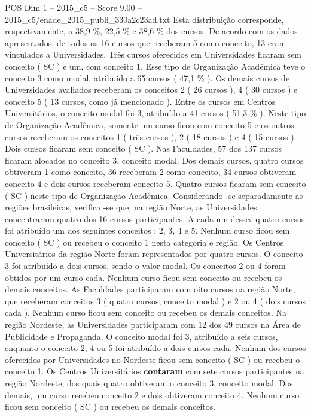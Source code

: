 \begin{textsample}{POS Dim 1 – 2015\_c5 – Score 9.00 – 2015\_c5/enade\_2015\_publi\_330a2c23ad.txt}
Esta distribuição corresponde, respectivamente, a 38,9 \%, 22,5 \% e 38,6 \% dos cursos.
De acordo com os dados apresentados, de todos os 16 cursos que receberam 5 como conceito, 13 eram vinculados a Universidades.
Três cursos oferecidos em Universidades ficaram sem conceito ( SC ) e um, com conceito 1.
Esse tipo de Organização Acadêmica teve o conceito 3 como modal, atribuído a 65 cursos ( 47,1 \% ).
Os demais cursos de Universidades avaliados receberam os conceitos 2 ( 26 cursos ), 4 ( 30 cursos ) e conceito 5 ( 13 cursos, como já mencionado ).
Entre os cursos em Centros Universitários, o conceito modal foi 3, atribuído a 41 cursos ( 51,3 \% ).
Neste tipo de Organização Acadêmica, somente um curso ficou com conceito 5 e os outros cursos receberam os conceitos 1 ( três cursos ), 2 ( 18 cursos ) e 4 ( 15 cursos ).
Dois cursos ficaram sem conceito ( SC ).
Nas Faculdades, 57 dos 137 cursos ficaram alocados no conceito 3, conceito modal.
Dos demais cursos, quatro cursos obtiveram 1 como conceito, 36 receberam 2 como conceito, 34 cursos obtiveram conceito 4 e dois cursos receberam conceito 5.
Quatro cursos ficaram sem conceito ( SC ) neste tipo de Organização Acadêmica.
Considerando -se separadamente as regiões brasileiras, verifica -se que, na região Norte, as Universidades concentraram quatro dos 16 cursos participantes.
A cada um desses quatro cursos foi atribuído um dos seguintes conceitos : 2, 3, 4 e 5.
Nenhum curso ficou sem conceito ( SC ) ou recebeu o conceito 1 nesta categoria e região.
Os Centros Universitários da região Norte foram representados por quatro cursos.
O conceito 3 foi atribuído a dois cursos, sendo o valor modal.
Os conceitos 2 ou 4 foram obtidos por um curso cada.
Nenhum curso ficou sem conceito ou recebeu os demais conceitos.
As Faculdades participaram com oito cursos na região Norte, que receberam conceitos 3 ( quatro cursos, conceito modal ) e 2 ou 4 ( dois cursos cada ).
Nenhum curso ficou sem conceito ou recebeu os demais conceitos.
Na região Nordeste, as Universidades participaram com 12 dos 49 cursos na Área de Publicidade e Propaganda.
O conceito modal foi 3, atribuído a seis cursos, enquanto o conceito 2, 4 ou 5 foi atribuído a dois cursos cada.
Nenhum dos cursos oferecidos por Universidades no Nordeste ficou sem conceito ( SC ) ou recebeu o conceito 1.
Os Centros Universitários \textbf{contaram} com sete cursos participantes na região Nordeste, dos quais quatro obtiveram o conceito 3, conceito modal.
Dos demais, um curso recebeu conceito 2 e dois obtiveram conceito 4.
Nenhum curso ficou sem conceito ( SC ) ou recebeu os demais conceitos.

\end{textsample}
